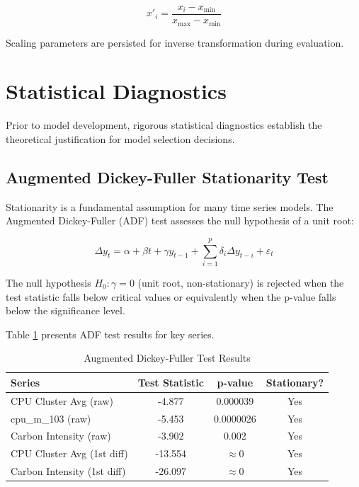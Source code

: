 \documentclass[12pt]{report}
\begin{document}
\begin{equation}
x'_i = \frac{x_i - x_{\min}}{x_{\max} - x_{\min}}
\end{equation}

Scaling parameters are persisted for inverse transformation during evaluation.

\section{Statistical Diagnostics}

Prior to model development, rigorous statistical diagnostics establish the theoretical justification for model selection decisions.

\subsection{Augmented Dickey-Fuller Stationarity Test}

Stationarity is a fundamental assumption for many time series models. The Augmented Dickey-Fuller (ADF) test assesses the null hypothesis of a unit root:

\begin{equation}
\Delta y_t = \alpha + \beta t + \gamma y_{t-1} + \sum_{i=1}^{p} \delta_i \Delta y_{t-i} + \varepsilon_t
\end{equation}

The null hypothesis $H_0: \gamma = 0$ (unit root, non-stationary) is rejected when the test statistic falls below critical values or equivalently when the p-value falls below the significance level.

Table \ref{tab:adf_results} presents ADF test results for key series.

\begin{table}[H]
\centering
\caption{Augmented Dickey-Fuller Test Results}
\label{tab:adf_results}
\begin{tabular}{lccc}
\toprule
\textbf{Series} & \textbf{Test Statistic} & \textbf{p-value} & \textbf{Stationary?} \\
\midrule
CPU Cluster Avg (raw) & -4.877 & 0.000039 & Yes \\
cpu\_m\_103 (raw) & -5.453 & 0.0000026 & Yes \\
Carbon Intensity (raw) & -3.902 & 0.002 & Yes \\
CPU Cluster Avg (1st diff) & -13.554 & $\approx 0$ & Yes \\
Carbon Intensity (1st diff) & -26.097 & $\approx 0$ & Yes \\
\bottomrule
\end{tabular}
\end{table}
\end{document}
